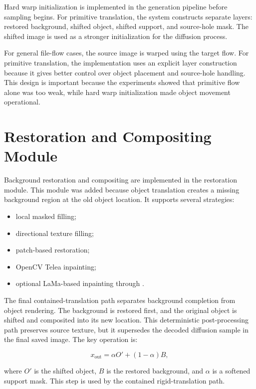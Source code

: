 Hard warp initialization is implemented in the generation pipeline before sampling begins. For primitive translation, the system constructs separate layers: restored background, shifted object, shifted support, and source-hole mask. The shifted image is used as a stronger initialization for the diffusion process.

For general file-flow cases, the source image is warped using the target flow. For primitive translation, the implementation uses an explicit layer construction because it gives better control over object placement and source-hole handling. This design is important because the experiments showed that primitive flow alone was too weak, while hard warp initialization made object movement operational.

\section{Restoration and Compositing Module}

Background restoration and compositing are implemented in the restoration module. This module was added because object translation creates a missing background region at the old object location. It supports several strategies:

\begin{itemize}
  \item local masked filling;
  \item directional texture filling;
  \item patch-based restoration;
  \item OpenCV Telea inpainting;
  \item optional LaMa-based inpainting through .
\end{itemize}

The final contained-translation path separates background completion from object rendering. The background is restored first, and the original object is shifted and composited into its new location. This deterministic post-processing path preserves source texture, but it supersedes the decoded diffusion sample in the final saved image. The key operation is:

\begin{equation}
x_{\mathrm{out}} = \alpha O' + (1-\alpha)B,
\end{equation}

where $O'$ is the shifted object, $B$ is the restored background, and $\alpha$ is a softened support mask. This step is used by the contained rigid-translation path.

